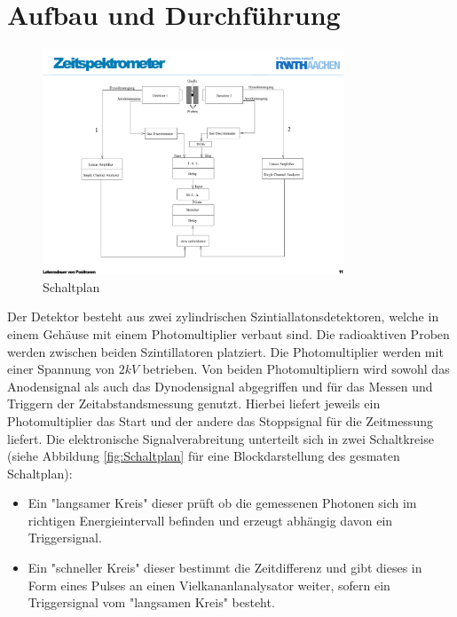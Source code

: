 \documentclass[a4paper,12pt]{article}
\begin{document}
\section{Aufbau und Durchführung}
\begin{figure}[htb]
		\centering
		\includegraphics[width=0.8\textwidth]{schaltplan.pdf}
		\caption{Schaltplan}
		\label{fig:schaltplan}
\end{figure}
Der Detektor besteht aus zwei zylindrischen Szintiallatonsdetektoren,
 welche in einem Gehäuse mit einem Photomultiplier verbaut sind. Die radioaktiven Proben werden zwischen beiden Szintillatoren
platziert. Die Photomultiplier werden mit einer Spannung von $2\si{kV}$ betrieben. Von beiden Photomultipliern
wird sowohl das Anodensignal als auch das Dynodensignal abgegriffen und für das Messen und Triggern der 
Zeitabstandsmessung genutzt. Hierbei liefert jeweils ein Photomultiplier das Start und der andere 
das Stoppsignal für die Zeitmessung liefert.
Die elektronische Signalverabreitung unterteilt sich in zwei Schaltkreise
 (siehe Abbildung \ref{fig:Schaltplan} für eine Blockdarstellung des gesmaten Schaltplan): \\
\begin{itemize}
	\item
	Ein "langsamer Kreis" dieser prüft ob die gemessenen Photonen sich im richtigen Energieintervall 
	befinden und erzeugt abhängig davon ein Triggersignal.
	\item Ein "schneller Kreis" dieser bestimmt die Zeitdifferenz und gibt dieses in Form eines Pulses an einen
	Vielkananlanalysator weiter, sofern ein Triggersignal vom "langsamen Kreis" besteht.	
\end{itemize}
\end{document}
